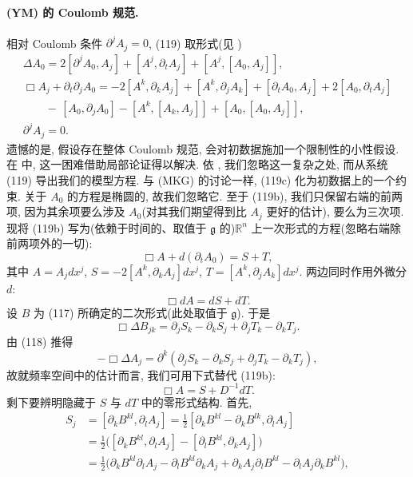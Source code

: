 \paragraph*{(YM) 的 Coulomb 规范.} 相对 Coulomb 条件 $\partial^j A_j=0$, (119) 取形式(见 \cite{klai34})
\begin{gather}
\Delta A_0=2[\partial^j A_0,A_j]+[A^j,\partial_t A_j]+[A^j,[A_0,A_j]],\\
\Box A_j+\partial_t\partial_j A_0=-2[A^k,\partial_k A_j]+[A^k,\partial_j A_k]+[\partial_t A_0,A_j]+2[A_0,\partial_t A_j]\nonumber\\
\qquad-\,[A_0,\partial_j A_0]-[A^k,[A_k,A_j]]+[A_0,[A_0,A_j]],\\
\partial^j A_j=0.\end{gather}
遗憾的是, 假设存在整体 Coulomb 规范, 会对初数据施加一个限制性的小性假设. 在 \cite{klai34} 中, 这一困难借助局部论证得以解决. 依 \cite{klai47}, 我们忽略这一复杂之处, 而从系统 (119) 导出我们的模型方程.
与 (MKG) 的讨论一样, (119c) 化为初数据上的一个约束. 关于 $A_0$ 的方程是椭圆的, 故我们忽略它. 至于 (119b), 我们只保留右端的前两项, 因为其余项要么涉及 $A_0$(对其我们期望得到比 $A_j$ 更好的估计), 要么为三次项.
现将 (119b) 写为(依赖于时间的、取值于 $\mathfrak{g}$ 的)$\mathbb{R}^n$ 上一次形式的方程(忽略右端除前两项外的一切):
\begin{equation}
\Box A+d(\partial_t A_0)=S+T,\end{equation}
其中 $A=A_j dx^j$, $S=-2[A^k,\partial_k A_j]dx^j$, $T=[A^k,\partial_j A_k]dx^j$. 两边同时作用外微分 $d$:
\begin{equation}
\Box dA=dS+dT.\end{equation}
设 $B$ 为 (117) 所确定的二次形式(此处取值于 $\mathfrak{g}$). 于是
\begin{equation}
\Box\Delta B_{jk}=\partial_j S_k-\partial_k S_j+\partial_j T_k-\partial_k T_j.\end{equation}
由 (118) 推得
\begin{equation}
-\Box\Delta A_j=\partial^k(\partial_j S_k-\partial_k S_j+\partial_j T_k-\partial_k T_j),\end{equation}
故就频率空间中的估计而言, 我们可用下式替代 (119b):
\begin{equation}
\Box A=S+D^{-1}dT.\end{equation}
剩下要辨明隐藏于 $S$ 与 $dT$ 中的零形式结构. 首先,
\begin{align*}
S_j&=[\partial_k B^{kl},\partial_l A_j]=\frac12[\partial_k B^{kl}-\partial_k B^{lk},\partial_l A_j]\\
&=\frac12\bigl([\partial_k B^{kl},\partial_l A_j]-[\partial_l B^{kl},\partial_k A_j]\bigr)\\
&=\frac12\bigl(\partial_k B^{kl}\partial_l A_j-\partial_l B^{kl}\partial_k A_j+\partial_k A_j\partial_l B^{kl}-\partial_l A_j\partial_k B^{kl}\bigr),\end{align*}
